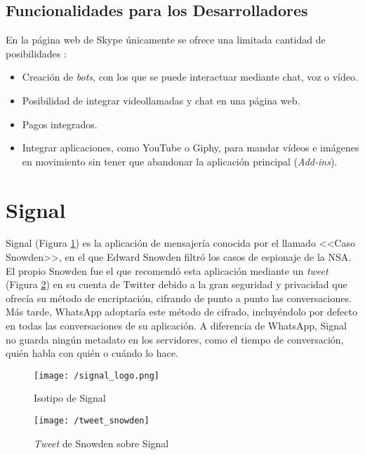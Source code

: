 \newpage

\subsection{Funcionalidades para los Desarrolladores}
En la página web de Skype únicamente se ofrece una limitada cantidad de posibilidades \cite{Skype2017a}:

\begin{itemize}
	\item Creación de \textit{bots}, con los que se puede interactuar mediante chat, voz o vídeo.
	\item Posibilidad de integrar videollamadas y chat en una página web.
	\item Pagos integrados.
	\item Integrar aplicaciones, como YouTube o Giphy, para mandar vídeos e imágenes en movimiento sin tener que abandonar la aplicación principal (\textit{Add-ins}).
\end{itemize}

\section{Signal}
\label{sec:signal}

Signal (Figura \ref{fig:signal}) es la aplicación de mensajería conocida por el llamado <<Caso \mbox{Snowden}>>, en el que Edward Snowden filtró los casos de espionaje de la \acf{NSA}. El propio Snowden fue el que recomendó esta aplicación mediante un \textit{tweet} (Figura \ref{fig:tweetsnowden}) en su cuenta de Twitter debido a la gran seguridad y privacidad que ofrecía su método de encriptación, cifrando de punto a punto las conversaciones. Más tarde, WhatsApp adoptaría este método de cifrado, incluyéndolo por defecto en todas las conversaciones de su aplicación. A diferencia de WhatsApp, Signal no guarda ningún metadato en los servidores, como el tiempo de conversación, quién habla con quién o cuándo lo hace.

\begin{figure}[!h]
	\begin{center}
		\texttt{[image: /signal\_logo.png]}
		\caption{Isotipo de Signal}
		\label{fig:signal}
	\end{center}
\end{figure}

\begin{figure}[!h]
	\begin{center}
		\texttt{[image: /tweet\_snowden]}
		\caption{\textit{Tweet} de Snowden sobre Signal}
		\label{fig:tweetsnowden}
	\end{center}
\end{figure}

